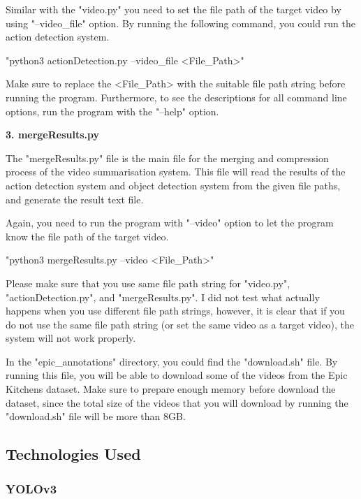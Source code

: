 \documentclass{article}
\begin{document}
Similar with the "video.py" you need to set the file path of the target video by using "--video\_file" option. By running the following command, you could run the action detection system.\newline

"python3 actionDetection.py --video\_file <File\_Path>"\newline

Make sure to replace the <File\_Path> with the suitable file path string before running the program. Furthermore, to see the descriptions for all command line options, run the program with the "--help" option.\newline

\textbf{3. mergeResults.py}

The "mergeResults.py" file is the main file for the merging and compression process of the video summarisation system. This file will read the results of the action detection system and object detection system from the given file paths, and generate the result text file.

Again, you need to run the program with "--video" option to let the program know the file path of the target video.

"python3 mergeResults.py --video <File\_Path>"\newline

Please make sure that you use same file path string for "video.py", "actionDetection.py", and "mergeResults.py". I did not test what actually happens when you use different file path strings, however, it is clear that if you do not use the same file path string (or set the same video as a target video), the system will not work properly.\newline


In the "epic\_annotations" directory, you could find the "download.sh" file. By running this file, you will be able to download some of the videos from the Epic Kitchens dataset. Make sure to prepare enough memory before download the dataset, since the total size of the videos that you will download by running the "download.sh" file will be more than 8GB.

\newpage

\subsection{Technologies Used}

\subsubsection{YOLOv3}
\end{document}
